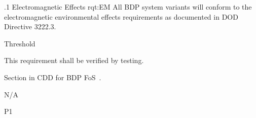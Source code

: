 

\ONERQMTVKSA
{\RqtNumberBase.1}
{Electromagnetic Effects}
{rqt:EM}
{All BDP system variants will conform to the electromagnetic environmental effects requirements as documented in DOD Directive 3222.3.}
{
	\item [Phase 1] Threshold
}
{This requirement shall be verified by testing.}
{
\item [8.1] Section in CDD for BDP FoS~\cite{ref__BDP_FOS_CDD}.
}
{
	\item N/A
}
{P1}
